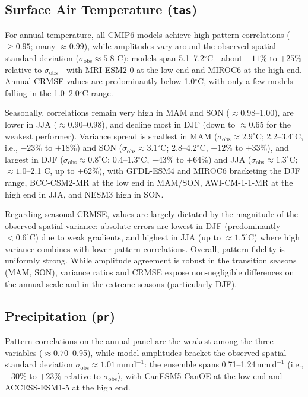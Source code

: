 \documentclass[pdflatex,sn-chicago]{sn-jnl}%
\theoremstyle{thmstyleone}%
\theoremstyle{thmstyletwo}%
\theoremstyle{thmstylethree}%
\begin{document}
\begin{appendices}
\subsection*{Surface Air Temperature (\texttt{tas})}
For annual temperature, all CMIP6 models achieve high pattern correlations ($\geq 0.95$; many $\approx 0.99$), while amplitudes vary around the observed spatial standard deviation ($\sigma_\text{obs} \approx 5.8^\circ$C): models span 5.1--7.2$^\circ$C---about $-11\%$ to $+25\%$ relative to $\sigma_\text{obs}$---with MRI-ESM2-0 at the low end and MIROC6 at the high end. Annual CRMSE values are predominantly below 1.0$^\circ$C, with only a few models falling in the 1.0--2.0$^\circ$C range. 

Seasonally, correlations remain very high in MAM and SON ($\approx 0.98$--1.00), are lower in JJA ($\approx 0.90$--0.98), and decline most in DJF (down to $\approx 0.65$ for the weakest performer). Variance spread is smallest in MAM ($\sigma_\text{obs} \approx 2.9^\circ$C; 2.2--3.4$^\circ$C, i.e., $-23\%$ to $+18\%$) and SON ($\sigma_\text{obs} \approx 3.1^\circ$C; 2.8--4.2$^\circ$C, $-12\%$ to $+33\%$), and largest in DJF ($\sigma_\text{obs} \approx 0.8^\circ$C; 0.4--1.3$^\circ$C, $-43\%$ to $+64\%$) and JJA ($\sigma_\text{obs} \approx 1.3^\circ$C; $\approx 1.0$--2.1$^\circ$C, up to $+62\%$), with GFDL-ESM4 and MIROC6 bracketing the DJF range, BCC-CSM2-MR at the low end in MAM/SON, AWI-CM-1-1-MR at the high end in JJA, and NESM3 high in SON. 

Regarding seasonal CRMSE, values are largely dictated by the magnitude of the observed spatial variance: absolute errors are lowest in DJF (predominantly $<0.6^\circ$C) due to weak gradients, and highest in JJA (up to $\approx 1.5^\circ$C) where high variance combines with lower pattern correlations. Overall, pattern fidelity is uniformly strong. While amplitude agreement is robust in the transition seasons (MAM, SON), variance ratios and CRMSE expose non-negligible differences on the annual scale and in the extreme seasons (particularly DJF).

\subsection*{Precipitation (\texttt{pr})}
Pattern correlations on the annual panel are the weakest among the three variables ($\approx 0.70$--0.95), while model amplitudes bracket the observed spatial standard deviation $\sigma_{\text{obs}} \approx 1.01\,\mathrm{mm\,d^{-1}}$: the ensemble spans 0.71--1.24\,$\mathrm{mm\,d^{-1}}$ (i.e., $-30\%$ to $+23\%$ relative to $\sigma_{\text{obs}}$), with CanESM5-CanOE at the low end and ACCESS-ESM1-5 at the high end. 


\end{appendices}
\end{document}
